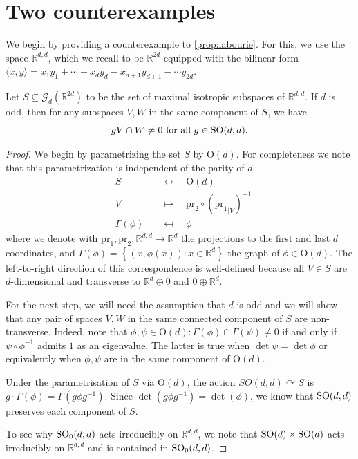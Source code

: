 \documentclass{report}
\begin{document}
\section{Two counterexamples}\label{sec:two_counterexamples}
We begin by providing a counterexample to \cref{prop:labourie}.
For this, we use the space $\mathbb R^{d,d}$, which we recall to be $\mathbb R^{2d}$ equipped with the bilinear form $\langle x, y \rangle = x_1 y_1 + \cdots + x_d y_d - x_{d+1} y_{d+1} - \cdots y_{2d}$.
\begin{example}
    Let $S \subseteq \mathcal G_d (\mathbb R^{2d})$ to be the set of maximal isotropic subspaces of $\mathbb R^{d,d}$.
    If $d$ is odd, then for any subspaces $V, W$ in the same component of $S$, we have 
    \[
        gV \cap W \neq 0 \text{ for all } g \in \operatorname{{\mathrm{SO}}}(d,d).
    \]
\end{example}
\begin{proof}
    We begin by parametrizing the set $S$ by $\mathrm{O}(d)$.
    For completeness we note that this parametrization is independent of the parity of $d$.
    \[\begin{array}{lll}
        &S \quad &\leftrightarrow \quad \mathrm{O}(d) \\
        &V \quad &\mapsto \quad \mathrm{pr}_2 \circ ({\mathrm{pr}_1}_{|V})^{-1} \\
        &\Gamma(\phi) \quad &\mapsfrom \quad \phi
    \end{array}\]
    where we denote with $\mathrm{pr}_1, \mathrm{pr}_2: \mathbb R^{d,d} \to \mathbb R^d$ the projections to the first and last $d$ coordinates, and $\Gamma(\phi) = \left\{ (x, \phi(x)) : x \in \mathbb R^d\right\}$ the graph of $\phi \in \mathrm{O}(d)$. 
    The left-to-right direction of this correspondence is well-defined because all $V \in S$ are $d$-dimensional and transverse to $\mathbb R^d \oplus 0$ and $0 \oplus \mathbb R^d$.

    For the next step, we will need the assumption that $d$ is odd and we will show that any pair of spaces $V, W$ in the same connected component of $S$ are non-transverse.
    Indeed, note that $\phi, \psi \in \mathrm{O}(d): \Gamma(\phi) \cap \Gamma(\psi) \neq 0$ if and only if $\psi \circ \phi^{-1}$ admits $1$ as an eigenvalue.
    The latter is true when $\det \psi = \det \phi$ or equivalently when $\phi, \psi$ are in the same component of $\mathrm{O}(d)$.

    Under the parametrisation of $S$ via $\mathrm{O}(d)$, the action $SO(d,d) \curvearrowright S$ is $g \cdot \Gamma(\phi) = \Gamma(g \phi g^{-1})$.
    Since $\det (g \phi g^{-1}) = \det (\phi)$, we know that $\operatorname{{\mathrm{SO}}}(d,d)$ preserves each component of $S$.

    To see why $\operatorname{{\mathrm{SO}}}_0(d,d)$ acts irreducibly on $\mathbb R^{d,d}$, we note that $\operatorname{{\mathrm{SO}}}(d) \times \operatorname{{\mathrm{SO}}}(d)$ acts irreducibly on $\mathbb R^{d,d}$ and is contained in $\operatorname{{\mathrm{SO}}}_0(d,d)$.
\end{proof}
\end{document}
